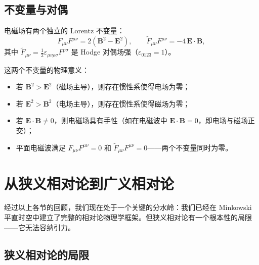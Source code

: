 \subsection{不变量与对偶}

\begin{example}
电磁场有两个独立的 Lorentz 不变量：
\[
F_{\mu\nu}F^{\mu\nu} = 2(\mathbf{B}^2 - \mathbf{E}^2), \qquad
\tilde{F}_{\mu\nu}F^{\mu\nu} = -4\,\mathbf{E}\cdot\mathbf{B},
\]
其中 $\tilde{F}_{\mu\nu} = \frac{1}{2}\varepsilon_{\mu\nu\rho\sigma}F^{\rho\sigma}$ 是 Hodge 对偶场强（$\varepsilon_{0123} = 1$）。

这两个不变量的物理意义：
\begin{itemize}
    \item 若 $\mathbf{B}^2 > \mathbf{E}^2$（磁场主导），则存在惯性系使得电场为零；
    \item 若 $\mathbf{E}^2 > \mathbf{B}^2$（电场主导），则存在惯性系使得磁场为零；
    \item 若 $\mathbf{E}\cdot\mathbf{B} \neq 0$，则电磁场具有手性（如在电磁波中 $\mathbf{E}\cdot\mathbf{B} = 0$，即电场与磁场正交）；
    \item 平面电磁波满足 $F_{\mu\nu}F^{\mu\nu} = 0$ 和 $\tilde{F}_{\mu\nu}F^{\mu\nu} = 0$——两个不变量同时为零。
\end{itemize}
\end{example}

\section{从狭义相对论到广义相对论}

经过以上各节的回顾，我们现在处于一个关键的分水岭：我们已经在 Minkowski 平直时空中建立了完整的相对论物理学框架。但狭义相对论有一个根本性的局限——它无法容纳引力。

\subsection{狭义相对论的局限}

